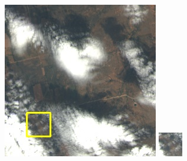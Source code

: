 \documentclass[10pt,UTF8,fntef]{ctexart}
\begin{document}
\begin{figure}[H]
{{\begin{minipage}[b]{0.15\linewidth}
            \includegraphics[width=1\linewidth]{../log/spoon3/cut/LC80290372013257LGN00_17086_color.jpg}\vspace{4pt}        
            \includegraphics[width=1\linewidth]{../log/spoon3/cut/tmp_cut_LC80290372013257LGN00_17086_color.jpg}\vspace{4pt}

\end{minipage}}}
\end{figure}
\end{document}
